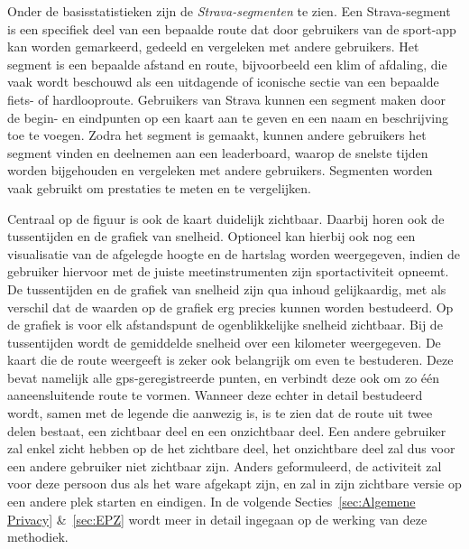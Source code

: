 Onder de basisstatistieken zijn de \textit{Strava-segmenten} te zien. Een
Strava-segment is een specifiek deel van een bepaalde route dat door gebruikers
van de sport-app kan worden gemarkeerd, gedeeld en vergeleken met andere
gebruikers. Het segment is een bepaalde afstand en route, bijvoorbeeld een klim
of afdaling, die vaak wordt beschouwd als een uitdagende of iconische sectie
van een bepaalde fiets- of hardlooproute. Gebruikers van Strava kunnen een
segment maken door de begin- en eindpunten op een kaart aan te geven en een
naam en beschrijving toe te voegen. Zodra het segment is gemaakt, kunnen andere
gebruikers het segment vinden en deelnemen aan een leaderboard, waarop de
snelste tijden worden bijgehouden en vergeleken met andere gebruikers.
Segmenten worden vaak gebruikt om prestaties te meten en te vergelijken.

Centraal op de figuur is ook de kaart duidelijk zichtbaar. Daarbij horen ook de
tussentijden en de grafiek van snelheid. Optioneel kan hierbij ook nog een
visualisatie van de afgelegde hoogte en de hartslag worden weergegeven, indien
de gebruiker hiervoor met de juiste meetinstrumenten zijn sportactiviteit
opneemt. De tussentijden en de grafiek van snelheid zijn qua inhoud
gelijkaardig, met als verschil dat de waarden op de grafiek erg precies kunnen
worden bestudeerd. Op de grafiek is voor elk afstandspunt de ogenblikkelijke
snelheid zichtbaar. Bij de tussentijden wordt de gemiddelde snelheid over een
kilometer weergegeven. De kaart die de route weergeeft is zeker ook belangrijk
om even te bestuderen. Deze bevat namelijk alle \ac{gps}-geregistreerde punten,
en verbindt deze ook om zo één aaneensluitende route te vormen. Wanneer deze
echter in detail bestudeerd wordt, samen met de legende die aanwezig is, is te
zien dat de route uit twee delen bestaat, een zichtbaar deel en een onzichtbaar
deel. Een andere gebruiker zal enkel zicht hebben op de het zichtbare deel, het
onzichtbare deel zal dus voor een andere gebruiker niet zichtbaar zijn. Anders
geformuleerd, de activiteit zal voor deze persoon dus als het ware afgekapt
zijn, en zal in zijn zichtbare versie op een andere plek starten en eindigen.
In de volgende Secties~\ref{sec:Algemene Privacy} \&~\ref{sec:EPZ} wordt meer in
detail ingegaan op de werking van deze methodiek.

